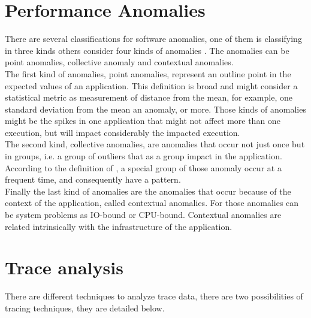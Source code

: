 \section{Performance Anomalies}
There are several classifications for software anomalies, one of them is classifying in three kinds \cite{Chandola2009ADS15418801541882} others consider four kinds of anomalies \cite{Ibidunmoye2015PAD28086872791120}. The anomalies can be point anomalies, collective anomaly and contextual anomalies.\\
The first kind of anomalies, point anomalies, represent an outline point in the expected values of an application. This definition is broad and might consider a statistical metric as measurement of distance from the mean, for example,  one standard deviation from the mean an anomaly, or more. Those kinds of anomalies might be the spikes in one application that might not affect more than one execution, but will impact considerably the impacted execution.\\
The second kind, collective anomalies, are anomalies that occur not just  once but in groups, i.e. a group of outliers that as a group impact in the application. According to the definition of \cite{Ibidunmoye2015PAD28086872791120}, a special group of those anomaly occur at a frequent time, and consequently have a pattern. \\
Finally the last kind of anomalies are the anomalies that occur because of the context of the application, called contextual anomalies. For those anomalies can be system problems as  IO-bound or CPU-bound. Contextual anomalies are related intrinsically with the infrastructure of the application.
\section{Trace analysis}
There are different techniques to analyze trace data, there are two possibilities of tracing techniques, they are detailed below.

